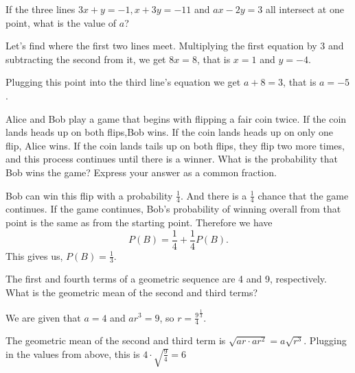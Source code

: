 \documentclass[11pt,twoside]{scrartcl}
\begin{document}
\begin{problem}
    If the three lines $ 3x+y=-1,x+3y=-11 $ and $ ax-2y=3 $ all intersect at one point, what is the value of $ a $?
    \begin{sketch}
        Let's find where the first two lines meet. Multiplying the first equation by 3 and subtracting the second from it, we get $8x = 8$, that is $x=1$ and $y=-4$. 
        
        Plugging this point into the third line's equation we get $a+8=3$, that is $a = \boxed{-5}$.
    \end{sketch}
\end{problem}

\begin{problem}
    Alice and Bob play a game that begins with flipping a fair coin twice. If the coin lands heads up on both flips,Bob wins. If the coin lands heads up on only one flip, Alice wins. If the coin lands tails up on both flips, they flip two more times, and this process continues until there is a winner. What is the probability that Bob wins the game? Express your answer as a common fraction.
    \begin{sketch}
        Bob can win this flip with a probability $\frac{1}{4}$. And there is a $\frac{1}{4}$ chance that the game continues. If the game continues, Bob's probability of winning overall from that point is the same as from the starting point. Therefore we have 
        \[P(B) = \frac{1}{4} + \frac{1}{4}P(B).\]
        This gives us, $P(B) = \boxed{\frac{1}{3}}$.
    \end{sketch}
\end{problem}

\begin{problem}
    The first and fourth terms of a geometric sequence are 4 and 9, respectively. What is the geometric mean of the second and third terms?
    \begin{sketch}
        We are given that $a=4$ and $ar^3=9$, so $r=\frac{9}{4}^{\frac{1}{3}}$. 

        The geometric mean of the second and third term is $\sqrt{ar\cdot ar^2} = a\sqrt{r^3}$.
        Plugging in the values from above, this is $4\cdot \sqrt{\frac{9}{4}} = \boxed{6}$
    \end{sketch}
\end{problem}
\end{document}
